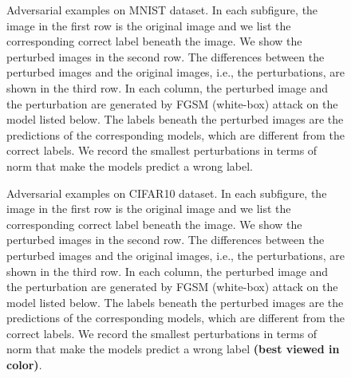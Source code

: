 \documentclass[11pt]{article}
\newcommand{\0}{\mathbf{0}}
\newcommand{\1}{\mathbf{1}}
\begin{document}
\begin{figure}
	\centering
	\quad
	\quad
	\quad
	\caption{Adversarial examples on MNIST dataset. In each subfigure, the image in the first row is the original image and we list the corresponding correct label beneath the image. We show the perturbed images in the second row. The differences between the perturbed images and the original images, i.e., the perturbations, are shown in the third row. In each column, the perturbed image and the perturbation are generated by FGSM (white-box) attack on the model listed below. The labels beneath the perturbed images are the predictions of the corresponding models, which are different from the correct labels. We record the smallest perturbations in terms of  norm that make the models predict a wrong label.}
	\label{figure: MNIST-adv-images}
\end{figure}



\begin{figure}[htbp]
	\centering
	\quad
	\quad
	\quad
	\caption{Adversarial examples on CIFAR10 dataset. In each subfigure, the image in the first row is the original image and we list the corresponding correct label beneath the image. We show the perturbed images in the second row. The differences between the perturbed images and the original images, i.e., the perturbations, are shown in the third row. In each column, the perturbed image and the perturbation are generated by FGSM (white-box) attack on the model listed below. The labels beneath the perturbed images are the predictions of the corresponding models, which are different from the correct labels. We record the smallest perturbations in terms of  norm that make the models predict a wrong label \textbf{(best viewed in color)}.}
	\label{figure: CIFAR10-adv-images}
\end{figure}
\end{document}
